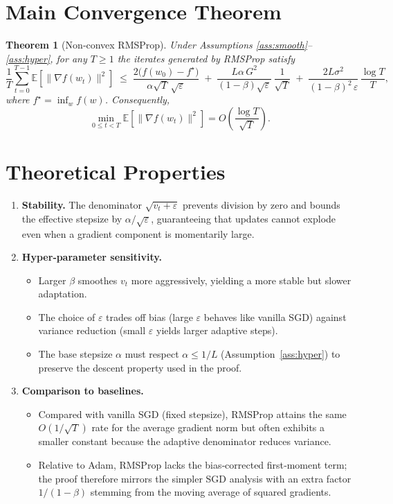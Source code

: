 \documentclass{article}
\newtheorem{theorem}{Theorem}
\newcommand{\EE}{\mathbb{E}}
\begin{document}
\section*{Main Convergence Theorem}
\begin{theorem}[Non‑convex RMSProp]\label{thm:main}
Under Assumptions \ref{ass:smooth}–\ref{ass:hyper}, for any $T\ge 1$ the iterates generated by RMSProp satisfy
\[
\frac{1}{T}\sum_{t=0}^{T-1}\EE\!\left[\|\nabla f(w_{t})\|^{2}\right]
\;\le\;
\frac{2\big(f(w_{0})-f^{\star}\big)}{\alpha\sqrt{T}\,\sqrt{\varepsilon}}
\;+\;
\frac{L\alpha\,G^{2}}{(1-\beta)\sqrt{\varepsilon}}\,
\frac{1}{\sqrt{T}}
\;+\;
\frac{2L\sigma^{2}}{(1-\beta)^{2}\,\varepsilon}\,
\frac{\log T}{T},
\]
where $f^{\star}=\inf_{w}f(w)$. Consequently,
\[
\min_{0\le t<T}\EE\!\left[\|\nabla f(w_{t})\|^{2}\right]=O\!\left(\frac{\log T}{\sqrt{T}}\right).
\]
\end{theorem}

\section*{Theoretical Properties}
\begin{enumerate}[label=\arabic*.]
\item \textbf{Stability.} The denominator $\sqrt{v_{t}+\varepsilon}$ prevents division by zero and
bounds the effective stepsize by $\alpha/\sqrt{\varepsilon}$, guaranteeing that updates cannot explode even when a gradient component is momentarily large.
\item \textbf{Hyper‑parameter sensitivity.}
    \begin{itemize}
        \item Larger $\beta$ smoothes $v_{t}$ more aggressively, yielding a more stable but slower adaptation.
        \item The choice of $\varepsilon$ trades off bias (large $\varepsilon$ behaves like vanilla SGD) against variance reduction (small $\varepsilon$ yields larger adaptive steps).
        \item The base stepsize $\alpha$ must respect $\alpha\le 1/L$ (Assumption~\ref{ass:hyper}) to preserve the descent property used in the proof.
    \end{itemize}
\item \textbf{Comparison to baselines.}
    \begin{itemize}
        \item Compared with vanilla SGD (fixed stepsize), RMSProp attains the same $O(1/\sqrt{T})$ rate for the average gradient norm but often exhibits a smaller constant because the adaptive denominator reduces variance.
        \item Relative to Adam, RMSProp lacks the bias‑corrected first‑moment term; the proof therefore mirrors the simpler SGD analysis with an extra factor $1/(1-\beta)$ stemming from the moving average of squared gradients.
    \end{itemize}
\end{enumerate}
\end{document}
